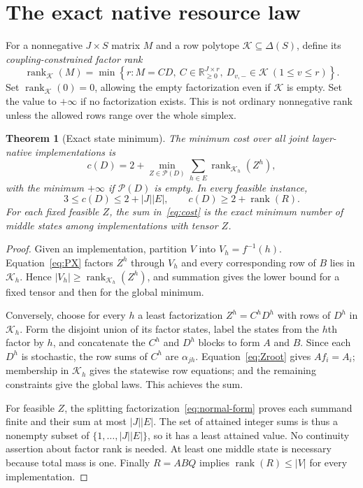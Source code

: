 \documentclass[11pt]{article}
\newcommand{\R}{\mathbb R}
\newcommand{\rk}{\operatorname{rank}}
\newcommand{\Pcal}{\mathcal P}
\newcommand{\Kcal}{\mathcal K}
\newtheorem{theorem}{Theorem}[section]
\theoremstyle{remark}
\begin{document}
\section{The exact native resource law}\label{sec:resources}

For a nonnegative $J\times S$ matrix $M$ and a row polytope $\Kcal\subseteq\Delta(S)$, define its \emph{coupling-constrained factor rank}
\begin{equation}\label{eq:restricted-rank}
 \operatorname{rank}_{\Kcal}(M)
 =\min\left\{r:M=CD,\ C\in\R_{\ge0}^{J\times r},\ D_{v,-}\in\Kcal\ (1\le v\le r)\right\}.
\end{equation}
Set $\operatorname{rank}_{\Kcal}(0)=0$, allowing the empty factorization even if $\Kcal$ is empty. Set the value to $+\infty$ if no factorization exists. This is not ordinary nonnegative rank unless the allowed rows range over the whole simplex.

\begin{theorem}[Exact state minimum]\label{thm:cost}
The minimum cost over all joint layer-native implementations is
\begin{equation}\label{eq:cost}
 c(D)=2+\min_{Z\in\Pcal(D)}\sum_{h\in E}
 \operatorname{rank}_{\Kcal_h}(Z^h),
\end{equation}
with the minimum $+\infty$ if $\Pcal(D)$ is empty. In every feasible instance,
\begin{equation}\label{eq:bounds}
 3\le c(D)\le 2+|J||E|,\qquad c(D)\ge2+\rk(R).
\end{equation}
For each fixed feasible $Z$, the sum in~\eqref{eq:cost} is the exact minimum number of middle states among implementations with tensor $Z$.
\end{theorem}
\begin{proof}
Given an implementation, partition $V$ into $V_h=f^{-1}(h)$. Equation~\eqref{eq:PX} factors $Z^h$ through $V_h$ and every corresponding row of $B$ lies in $\Kcal_h$. Hence $|V_h|\ge\operatorname{rank}_{\Kcal_h}(Z^h)$, and summation gives the lower bound for a fixed tensor and then for the global minimum.

Conversely, choose for every $h$ a least factorization $Z^h=C^hD^h$ with rows of $D^h$ in $\Kcal_h$. Form the disjoint union of its factor states, label the states from the $h$th factor by $h$, and concatenate the $C^h$ and $D^h$ blocks to form $A$ and $B$. Since each $D^h$ is stochastic, the row sums of $C^h$ are $\alpha_{jh}$. Equation~\eqref{eq:Zroot} gives $Af_i=A_i$; membership in $\Kcal_h$ gives the statewise row equations; and the remaining constraints give the global laws. This achieves the sum.

For feasible $Z$, the splitting factorization~\eqref{eq:normal-form} proves each summand finite and their sum at most $|J||E|$. The set of attained integer sums is thus a nonempty subset of $\{1,\ldots,|J||E|\}$, so it has a least attained value. No continuity assertion about factor rank is needed. At least one middle state is necessary because total mass is one. Finally $R=ABQ$ implies $\rk(R)\le |V|$ for every implementation.
\end{proof}
\end{document}
